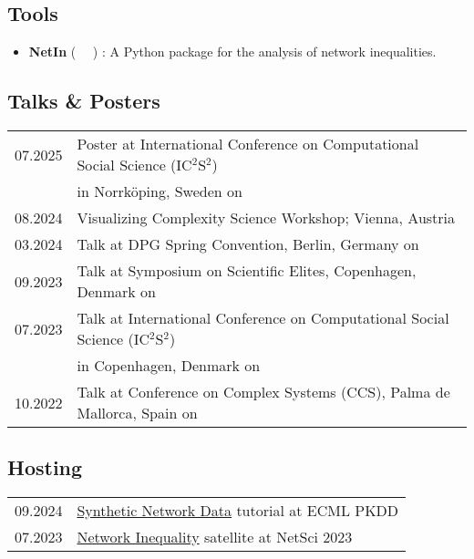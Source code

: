 \documentclass[11pt]{article} %
\begin{document}
\subsection*{Tools}
%
\begin{itemize}
    \item \textbf{NetIn} (~\href{https://pypi.org/project/netin/}{\faPython}
        \hspace{0.5em}\href{https://github.com/CSHVienna/NetworkInequalities}{\faGithub}
        \hspace{0.5em}\href{https://cshvienna.github.io/NetworkInequalities/}{\faFile*[regular]}~)
        : A Python package for the analysis of network inequalities.

\end{itemize}

\subsection*{Talks \& Posters}
\begin{longtable}[l]{@{}p{} p{}}
  07.2025     & Poster at International Conference on Computational Social Science (IC$^2$S$^2$)\\
              & in Norrk\"oping, Sweden on~\cite{bachmann.etal_networkinequalitypreferential_2025}\\
  08.2024     & Visualizing Complexity Science Workshop; Vienna, Austria\\
  03.2024     & Talk at DPG Spring Convention, Berlin, Germany on~\cite{bachmann.etal_cumulativeadvantagebrokerage_2024}\\
  09.2023     & Talk at Symposium on Scientific Elites, Copenhagen, Denmark on~\cite{bachmann.etal_cumulativeadvantagebrokerage_2024}\\
  07.2023     & Talk at International Conference on Computational Social Science (IC$^2$S$^2$)\\
              & in Copenhagen, Denmark on~\cite{bachmann.etal_cumulativeadvantagebrokerage_2024}\\
  10.2022     & Talk at Conference on Complex Systems (CCS), Palma de Mallorca, Spain on~\cite{bachmann.etal_cumulativeadvantagebrokerage_2024}
\end{longtable}

\subsection*{Hosting}
\label{organizing}
\begin{longtable}[l]{@{}p{} p{}}
  09.2024     & \href{https://sites.google.com/view/snma-tutorial/2024}{Synthetic Network Data} tutorial at ECML PKDD\\
  07.2023     & \href{https://sites.google.com/view/netin-satellite-2023/home}{Network Inequality} satellite at NetSci 2023\\
\end{longtable}
\end{document}
